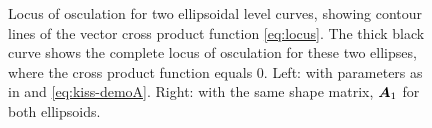 \begin{figure}[htb]
\begin{minipage}[b]{.49\linewidth}
 \end{minipage}
  \caption{Locus of osculation for two ellipsoidal level curves, showing contour lines of the vector cross product function \eqref{eq:locus}.
  The thick black curve shows the complete locus of osculation for these two ellipses, where the cross product function equals 0.
Left: with parameters as in  and \eqref{eq:kiss-demoA}. Right: with the same shape matrix, $\bm{A}_1$ for both
ellipsoids.}
  \label{fig:kiss-demo2}
\end{figure}
%

